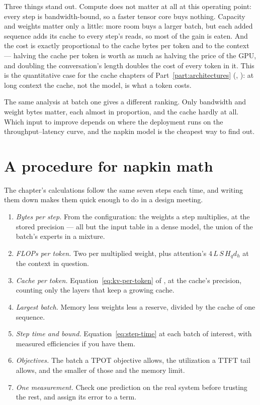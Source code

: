 \noindent Three things stand out. Compute does not matter at all at this
operating point: every step is bandwidth-bound, so a faster tensor core buys
nothing. Capacity and weights matter only a little: more room buys a larger
batch, but each added sequence adds its cache to every step's reads, so most of
the gain is eaten. And the cost is exactly proportional to the cache bytes per
token and to the context --- halving the cache per token is worth as much as
halving the price of the GPU, and doubling the conversation's length doubles the
cost of every token in it. This is the quantitative case for the cache chapters
of Part~\ref{part:architectures} (, ):
at long context the cache, not the model, is what a token costs.

The same analysis at batch one gives a different ranking. Only bandwidth and
weight bytes matter, each almost in proportion, and the cache hardly at all.
Which input to improve depends on where the deployment runs on the
throughput--latency curve, and the napkin model is the cheapest way to find out.

\section{A procedure for napkin math}

The chapter's calculations follow the same seven steps each time, and writing
them down makes them quick enough to do in a design meeting.

\begin{enumerate}
\item \emph{Bytes per step.} From the configuration: the weights a step
multiplies, at the stored precision --- all but the input table in a dense model,
the union of the batch's experts in a mixture.
\item \emph{FLOPs per token.} Two per multiplied weight, plus attention's
$4\,L\,S\,H_qd_h$ at the context in question.
\item \emph{Cache per token.} Equation~\eqref{eq:kv-per-token} of
, at the cache's precision, counting only the layers that keep
a growing cache.
\item \emph{Largest batch.} Memory less weights less a reserve, divided by the
cache of one sequence.
\item \emph{Step time and bound.} Equation~\eqref{eq:step-time} at each batch of
interest, with measured efficiencies if you have them.
\item \emph{Objectives.} The batch a TPOT objective allows, the utilization a
TTFT tail allows, and the smaller of those and the memory limit.
\item \emph{One measurement.} Check one prediction on the real system before
trusting the rest, and assign its error to a term.
\end{enumerate}

